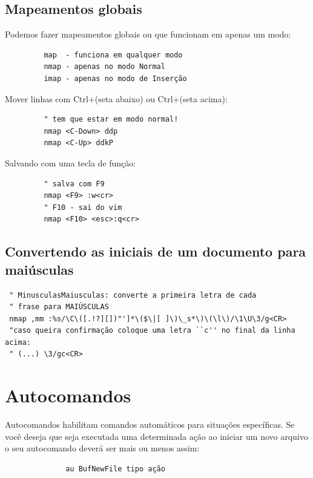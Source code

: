 \documentclass[10pt,a4paper,openany]{book}
\begin{document}
\subsection{Mapeamentos globais}


Podemos fazer mapeamentos globais ou que funcionam em apenas um modo:

\begin{verbatim}
		 map  - funciona em qualquer modo
		 nmap - apenas no modo Normal
		 imap - apenas no modo de Inserção
\end{verbatim}

Mover linhas com Ctrl+(seta abaixo) ou Ctrl+(seta acima):

\begin{verbatim}
		 " tem que estar em modo normal!
		 nmap <C-Down> ddp
		 nmap <C-Up> ddkP
\end{verbatim}

Salvando com uma tecla de função:

\begin{verbatim}
		 " salva com F9
		 nmap <F9> :w<cr>
		 " F10 - sai do vim
		 nmap <F10> <esc>:q<cr>
\end{verbatim}

\subsection{Convertendo as iniciais de um documento para maiúsculas}
\label{Convertendo as iniciais de um documento para maiúsculas}

\begin{verbatim}
 " MinusculasMaiusculas: converte a primeira letra de cada
 " frase para MAIÚSCULAS
 nmap ,mm :%s/\C\([.!?][])"']*\($\|[ ]\)\_s*\)\(\l\)/\1\U\3/g<CR>
 "caso queira confirmação coloque uma letra ``c'' no final da linha acima:
 " (...) \3/gc<CR>
\end{verbatim}

\section{Autocomandos }\label{Autocomandos }

Autocomandos habilitam comandos automáticos para situações
específicas. Se você deseja que seja executada uma determinada ação ao
iniciar um novo arquivo o seu autocomando deverá ser mais ou menos
assim:

\begin{verbatim}
			  au BufNewFile tipo ação
\end{verbatim}
\end{document}
